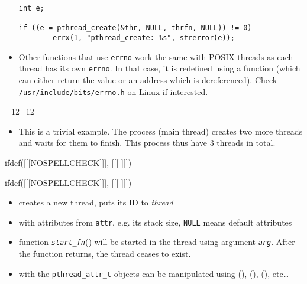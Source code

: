 \begin{itemize}
\begin{verbatim}
int e;

if ((e = pthread_create(&thr, NULL, thrfn, NULL)) != 0)
        errx(1, "pthread_create: %s", strerror(e));
\end{verbatim}

\item \label{ERRNO_IN_THREADS} Other functions that use \texttt{errno} work the
same with POSIX threads as each thread has its own \texttt{errno}.  In that
case, it is redefined using a function (which can either return the value or an
address which is dereferenced).  Check \texttt{/usr/include/bits/errno.h} on
Linux if interested.
\end{itemize}


\begin{slide}
{=12=12
\begin{center}

\end{center}}
\end{slide}

\begin{itemize}
\item This is a trivial example.  The process (main thread) creates two more
threads and waits for them to finish.  This process thus have 3 threads in
total.
\end{itemize}


ifdef([[[NOSPELLCHECK]]], [[[
]]])

\begin{slide}
\label{PTHREAD_T}
ifdef([[[NOSPELLCHECK]]], [[[
]]])
\begin{itemize}
\item creates a new thread, puts its ID to \emph{thread}
\item with attributes from \texttt{attr}, e.g. its stack size,
\texttt{NULL} means default attributes
\item function \emph{\texttt{start\_fn}}() will be started in the thread using
argument \emph{\texttt{arg}}. After the function returns, the thread ceases to
exist.
\item with the \texttt{pthread\_attr\_t} objects can be manipulated using
(), (),
(), etc\dots{}
\end{itemize}
\end{slide}

